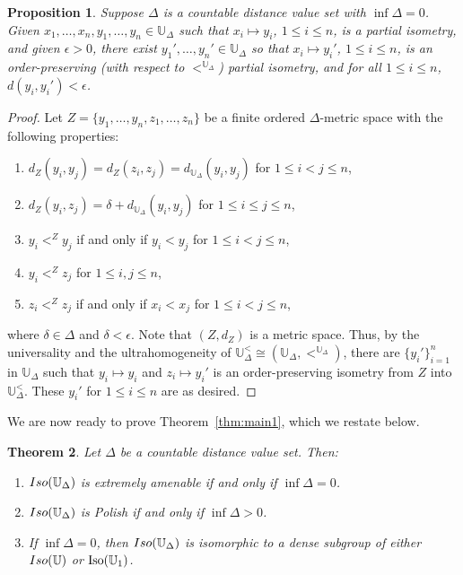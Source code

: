 \documentclass{amsart}
\newtheorem{theorem}{Theorem}[section]
\newtheorem{proposition}[theorem]{Proposition}
\theoremstyle{definition}
\theoremstyle{remark}
\begin{document}
    \begin{proposition}\label{Density} Suppose $\Delta$ is a countable distance value set with $\inf\Delta=0$.
        Given $x_1,\dots,x_n,y_1,\dots,y_n \in \mathbb{U}_{\Delta}$ such that $x_i \mapsto y_i$, $1\leq i\leq n$, is a partial isometry, and given $\epsilon>0$, there exist $y_1',\dots,y_n' \in \mathbb{U}_{\Delta}$ so that $x_i \mapsto y_i'$, $1\leq i\leq n$, is an order-preserving (with respect to $<^{\mathbb{U}_\Delta}$) partial isometry, and for all $1\leq i\leq n$, $d(y_i, y_i') < \epsilon$.
    \end{proposition}
    \begin{proof}
    Let $Z=\{y_1,\dots,y_n,z_1,\dots,z_n\}$ be a finite ordered $\Delta$-metric space with the following properties:
    \begin{enumerate}	
    \item[(i)] $d_Z(y_i,y_j)=d_Z(z_i,z_j)=d_{\mathbb{U}_\Delta}(y_i,y_j)$ for $1\leq i<j\leq n$,
    \item[(ii)] $d_Z(y_i,z_j)=\delta + d_{\mathbb{U}_\Delta}(y_i,y_j)$ for $1\leq i\leq j\leq n$,
    \item[(iii)] $y_i<^Zy_j$ if and only if $y_i<y_j$ for $1\leq i<j\leq n$,
    \item[(iv)] $y_i<^Zz_j$ for $1\leq i, j\leq n$,
    \item[(v)] $z_i<^Zz_j$ if and only if $x_i<x_j$ for $1\leq i<j\leq n$,
    \end{enumerate}
    where $\delta \in \Delta$ and $\delta<\epsilon$. Note that $(Z,d_Z)$ is a metric space. Thus, by the universality and the ultrahomogeneity of $\mathbb{U}_\Delta^< \cong (\mathbb{U}_\Delta, <^{\mathbb{U}_\Delta})$, there are $\{y_i'\}_{i=1}^n$ in $\mathbb{U}_\Delta$ such that $y_i\mapsto y_i$ and $z_i\mapsto y_i'$ is an order-preserving isometry from $Z$ into $\mathbb{U}_\Delta^<$. These $y_i'$ for $1\leq i\leq n$ are as desired.
    \end{proof}
 


We are now ready to prove Theorem~\ref{thm:main1}, which we restate below.

    \begin{theorem}\label{thm:main1res}
        Let $\Delta$ be a countable distance value set. Then: 
        \begin{enumerate}
            \item ${\rm Iso}(\mathbb{U}_\Delta)$ is extremely amenable if and only if $\inf\Delta=0$. 
            \item ${\rm Iso}(\mathbb{U}_\Delta)$ is Polish if and only if $\inf\Delta>0$. 
        \item If $\inf\Delta=0$, then ${\rm Iso}(\mathbb{U}_\Delta)$ is isomorphic to a dense subgroup of either ${\rm Iso}(\mathbb{U})$ or $\mbox{\rm Iso}(\mathbb{U}_1)$. 
\end{enumerate}
    \end{theorem}
  
\end{document}
